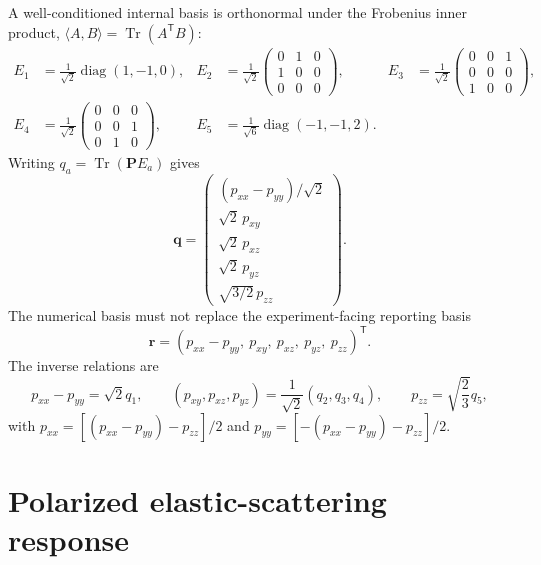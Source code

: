 \documentclass[11pt,a4paper]{article}
\newcommand{\Tens}{\bm P}
\newcommand{\vect}[1]{\bm{#1}}
\newcommand{\Tr}{\operatorname{Tr}}
\newcommand{\diag}{\operatorname{diag}}
\begin{document}
A well-conditioned internal basis is orthonormal under the Frobenius inner
product, $\langle A,B\rangle=\Tr(A^{\mathsf T}B)$:
\begin{align}
 E_1&=\frac{1}{\sqrt2}\diag(1,-1,0),&
 E_2&=\frac{1}{\sqrt2}
 \begin{pmatrix}0&1&0\\1&0&0\\0&0&0\end{pmatrix},&
 E_3&=\frac{1}{\sqrt2}
 \begin{pmatrix}0&0&1\\0&0&0\\1&0&0\end{pmatrix},\\
 E_4&=\frac{1}{\sqrt2}
 \begin{pmatrix}0&0&0\\0&0&1\\0&1&0\end{pmatrix},&
 E_5&=\frac{1}{\sqrt6}\diag(-1,-1,2).&&
\end{align}
Writing $q_a=\Tr(\Tens E_a)$ gives
\begin{equation}
 \vect q=
 \begin{pmatrix}
 (p_{xx}-p_{yy})/\sqrt2\\
 \sqrt2\,p_{xy}\\
 \sqrt2\,p_{xz}\\
 \sqrt2\,p_{yz}\\
 \sqrt{3/2}\,p_{zz}
 \end{pmatrix}.
 \label{eq:orthonormal-coordinates}
\end{equation}
The numerical basis must not replace the experiment-facing reporting basis
\begin{equation}
 \vect r=(p_{xx}-p_{yy},\ p_{xy},\ p_{xz},\ p_{yz},\ p_{zz})^{\mathsf T}.
 \label{eq:physical-basis}
\end{equation}
The inverse relations are
\begin{equation}
 p_{xx}-p_{yy}=\sqrt2q_1,\qquad
 (p_{xy},p_{xz},p_{yz})=\frac{1}{\sqrt2}(q_2,q_3,q_4),\qquad
 p_{zz}=\sqrt{\frac23}q_5,
\end{equation}
with $p_{xx}=[(p_{xx}-p_{yy})-p_{zz}]/2$ and
$p_{yy}=[-(p_{xx}-p_{yy})-p_{zz}]/2$.

\section{Polarized elastic-scattering response}
\end{document}
